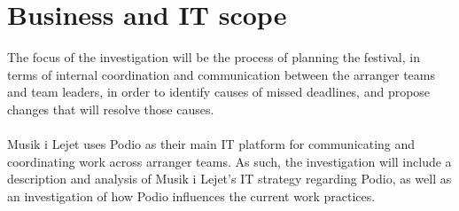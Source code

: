 \section{Business and IT scope}
The focus of the investigation will be the process of planning the festival, in terms of internal coordination and communication between the arranger teams and team leaders, in order to identify causes of missed deadlines, and propose changes that will resolve those causes.
\\ \\
Musik i Lejet uses Podio as their main IT platform for communicating and coordinating work across arranger teams. As such, the investigation will include a description and analysis of Musik i Lejet's IT strategy regarding Podio, as well as an investigation of how Podio influences the current work practices.
